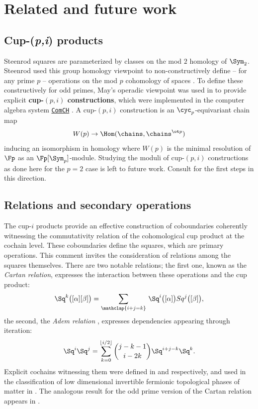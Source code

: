 
\section{Related and future work}\label{s:epilogue}

\subsection{Cup-(\textit{p,i}) products}

Steenrod squares are parameterized by classes on the mod $2$ homology of $\Sym_2$.
Steenrod used this group homology viewpoint to non-constructively define -- for any prime $p$ -- operations on the mod $p$ cohomology of spaces \cite{steenrod1952reduced, steenrod1953cyclic}.
To define these constructively for odd primes, May's operadic viewpoint \cite{may1970general} was used in \cite{medina2021may_st} to provide explicit \textbf{cup-$(p,i)$ constructions}, which were implemented in the computer algebra system \href{https://github.com/ammedmar/comch}{\texttt{ComCH}} \cite{medina2021comch}.
A \mbox{cup-$(p,i)$} construction is an $\cyc_p$-equivariant chain map
\[
W(p) \to \Hom(\chains, \chains^{\ot p})
\]
inducing an isomorphism in homology where $W(p)$ is the minimal resolution of $\Fp$ as an $\Fp[\Sym_p]$-module.
Studying the moduli of cup-$(p,i)$ constructions as done here for the $p = 2$ case is left to future work.
Consult \cite{medina2024connected} for the first steps in this direction.

\subsection{Relations and secondary operations}

The cup-$i$ products provide an effective construction of coboundaries coherently witnessing the commutativity relation of the cohomological cup product at the cochain level.
These coboundaries define the squares, which are primary operations.
This comment invites the consideration of relations among the squares themselves.
There are two notable relations;
the first one, known as the \textit{Cartan relation}, expresses the interaction between these operations and the cup product:
\begin{equation*}
	\Sq^k \big( [\alpha] [\beta] \big) =
	\sum_{\mathclap{i+j=k}} \, \Sq^i\big([\alpha]\big) Sq^j\big([\beta]\big),
\end{equation*}
the second, the \textit{Adem relation} \cite{adem1952iteration}, expresses dependencies appearing through iteration:
\begin{equation*}
	\Sq^i \Sq^j =
	\sum_{k=0}^{\lfloor i/2 \rfloor} \binom{j-k-1}{i-2k} \Sq^{i+j-k} \Sq^k.
\end{equation*}
Explicit cochains witnessing them were defined in \cite{medina2020cartan} and \cite{medina2021adem} respectively, and used in the classification of low dimensional invertible fermionic topological phases of matter in \cite{kapustin2017fermionic, barkeshli2022classification}.
The analogous result for the odd prime version of the Cartan relation appears in \cite{medina2025odd_cartan}.

